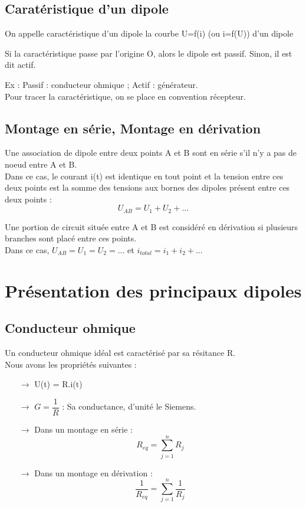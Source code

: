 \subsection{Caratéristique d'un dipole}
\begin{de}
On appelle caractéristique d'un dipole la courbe U=f(i) (ou i=f(U)) d'un dipole
\end{de}
\begin{prop}
Si la caractéristique passe par l'origine O, alors le dipole est passif. Sinon, il est dit actif.
\end{prop}
Ex : Passif : conducteur ohmique ; Actif : générateur.\\
Pour tracer la caractéristique, on se place en convention récepteur.
\subsection{Montage en série, Montage en dérivation}
\begin{de}
Une association de dipole entre deux points A et B sont en série s'il n'y a pas de noeud entre A et B.\\
Dans ce cas, le courant i(t) est identique en tout point et la tension entre ces deux points est la somme des tensions aux bornes des dipoles présent entre ces deux points :
$$U_{AB} = U_1 + U_2 + ...$$
\end{de}
\begin{de}
Une portion de circuit située entre A et B est considéré en dérivation si plusieurs branches sont placé entre ces points.\\
Dans ce cas, $U_{AB}= U_1 = U_2 = ...$ et $i_{total} = i_1 + i_2 + ...$
\end{de}
\section{Présentation des principaux dipoles}
\subsection{Conducteur ohmique}
Un conducteur ohmique idéal est caractérisé par sa résitance R.\\
Nous avons les propriétés suivantes :\\
\begin{itemize}
 \item[$\rightarrow$] U(t) = R.i(t) \\
 \item[$\rightarrow$] $G = \dfrac{1}{R}$ : Sa conductance, d'unité le Siemens.\\
 \item[$\rightarrow$] Dans un montage en série : $$R_{eq} = \sum_{j=1}^n R_j$$
 \item[$\rightarrow$] Dans un montage en dérivation : $$\dfrac{1}{R_{eq}} = \sum_{j=1}^n \dfrac{1}{R_j}$$
\end{itemize}

